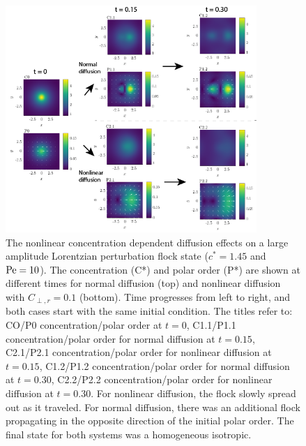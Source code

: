 \begin{figure}[!ht]
	\centering
  \includegraphics[width=0.85\textwidth]{figs/ch05_valid/nl_diff_back.png}
  \caption[Concentraion dependent diffusion (large flock perturbation)]
  {The nonlinear concentration dependent diffusion effects on a large
    amplitude Lorentzian perturbation flock state ($c^*=1.45$ and $\text{Pe} = 10$).
    The concentration (C*) and polar order (P*) are shown at different times for
    normal diffusion (top) and nonlinear diffusion with $C_{\perp,r} = 0.1$
    (bottom). Time progresses from left to right, and both cases start with the
    same initial condition. The titles refer to: CO/P0 concentration/polar order
    at $t=0$, C1.1/P1.1 concentration/polar order for normal diffusion at
    $t=0.15$, C2.1/P2.1 concentration/polar order for nonlinear diffusion at
    $t=0.15$, C1.2/P1.2 concentration/polar order for normal diffusion at
    $t=0.30$, C2.2/P2.2 concentration/polar order for nonlinear diffusion at
    $t=0.30$. For nonlinear diffusion, the flock slowly spread out as it
    traveled. For normal diffusion, there was an additional flock propagating in
    the opposite direction of the initial polar order. The final state for both
    systems was a homogeneous isotropic.}\label{fig:nl_diff_back}
\end{figure}


